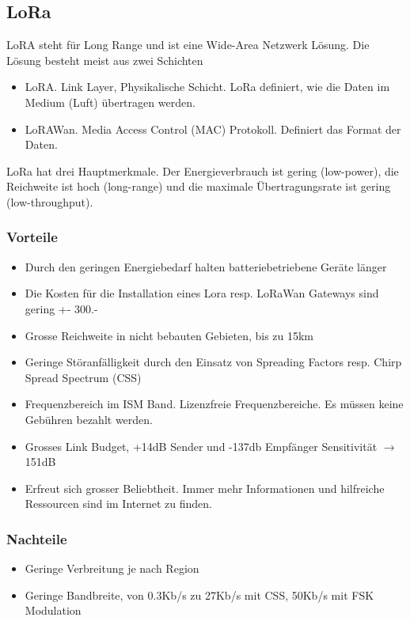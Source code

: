 \documentclass[11pt,english,german]{report}
\theoremstyle{definition}
\begin{document}
\subsection{LoRa}
LoRA steht für Long Range und ist eine Wide-Area Netzwerk Lösung. Die Lösung besteht meist aus zwei Schichten
\begin{itemize}
	\item LoRA. Link Layer, Physikalische Schicht. LoRa definiert, wie die Daten im Medium (Luft) übertragen werden.
	\item LoRAWan. Media Access Control (MAC) Protokoll. Definiert das Format der Daten.
\end{itemize}
LoRa hat drei Hauptmerkmale. Der Energieverbrauch ist gering (low-power), die Reichweite ist hoch (long-range) und die maximale Übertragungsrate ist gering (low-throughput).
\subsubsection{Vorteile}
\begin{itemize}
	\item Durch den geringen Energiebedarf halten batteriebetriebene Geräte länger
	\item Die Kosten für die Installation eines Lora resp. LoRaWan Gateways sind gering +- 300.-
	\item Grosse Reichweite in nicht bebauten Gebieten, bis zu 15km
	\item Geringe Störanfälligkeit durch den Einsatz von Spreading Factors resp. Chirp Spread Spectrum (CSS)
	\item Frequenzbereich im ISM Band. Lizenzfreie Frequenzbereiche. Es müssen keine Gebühren bezahlt werden.
	\item Grosses Link Budget, +14dB Sender und -137db Empfänger Sensitivität $\rightarrow$ 151dB
	\item Erfreut sich grosser Beliebtheit. Immer mehr Informationen und hilfreiche Ressourcen sind im Internet zu finden.
\end{itemize}
\subsubsection{Nachteile}
\begin{itemize}
	\item Geringe Verbreitung je nach Region
	\item Geringe Bandbreite, von 0.3Kb/s zu 27Kb/s mit CSS, 50Kb/s mit FSK Modulation \cite{loradatarate}
\end{itemize}
\end{document}
